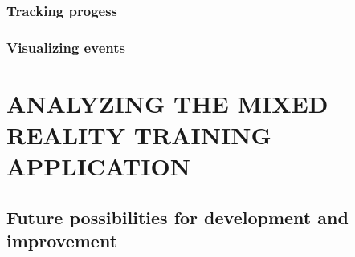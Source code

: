 \documentclass[12pt, a4paper,oneside, nocenter]{thesis}
\begin{document}
\subsection{Tracking progess}
\subsection{Visualizing events}
\par
\chapter{\MakeUppercase{Analyzing the mixed reality training application}}

\section{Future possibilities for development and improvement}


\newpage

\nocite{*}

\end{document}
